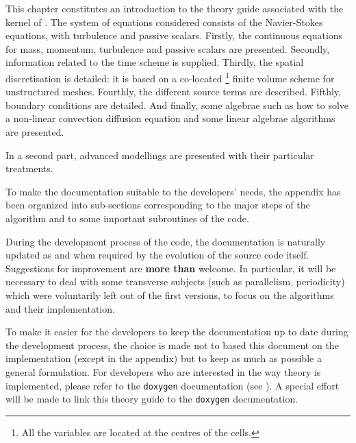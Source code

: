 This chapter constitutes an introduction to the theory guide
associated with the kernel of \CS.
The system of equations considered consists of the
Navier-Stokes equations, with turbulence and passive scalars. Firstly, the
continuous equations for mass, momentum, turbulence and passive scalars are
presented. Secondly, information related to the time scheme is supplied.
Thirdly, the spatial discretisation is detailed: it is based on a co-located%
\footnote{%
All the variables are located at the centres of the cells.} finite volume
scheme for unstructured meshes. Fourthly, the different source terms are 
described. Fifthly, boundary conditions are detailed. And finally, some algebrae
such as how to solve a non-linear convection diffusion equation and some 
linear algebrae algorithms are presented.

In a second part, advanced modellings are presented with their particular
treatments.

To make the documentation suitable to the developers' needs, the appendix
has been organized into sub-sections corresponding to the major steps of the
algorithm and to some important subroutines of the code.

During the development process of the code, the documentation is naturally
updated as and when required by the evolution of the source code itself.
Suggestions for improvement are \textbf{more than} welcome. In particular, 
it will be necessary to deal with some transverse subjects 
(such as parallelism, periodicity) which were voluntarily left out of 
the first versions, to focus on the algorithms and their implementation.

To make it easier for the developers to keep the documentation up to date
during the development process, the choice is made not to based this document
on the implementation (except in the appendix) but to keep as much as possible 
a general formulation. For developers who are interested in the way theory is
implemented, please refer to the \texttt{doxygen} documentation (see ). 
A special effort will be made to link this theory guide to the \texttt{doxygen}
documentation.

\clearpage 


